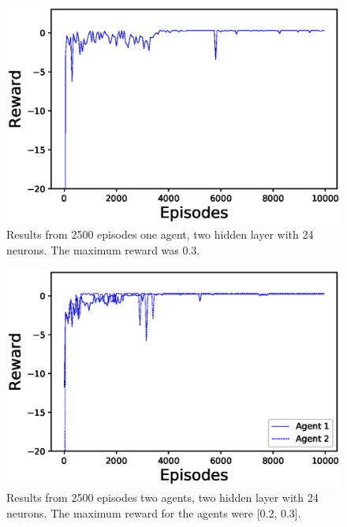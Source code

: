 \documentclass[journal,twoside]{IEEEtran}
\begin{document}
\begin{figure}[!h]
	\centering
	\includegraphics[width=\columnwidth]{1Agent_32n__2l_215000steps_125s}
	\caption{Results from 2500 episodes one agent, two hidden layer with 24 neurons. The maximum reward was 0.3.}
	\label{1agent32n}
\end{figure}

\begin{figure}[!h]
	\centering
	\includegraphics[width=\columnwidth]{2Agent_24n_2l_380000steps_251s}
	\caption{Results from 2500 episodes two agents, two hidden layer with 24 neurons. The maximum reward for the agents were [0.2, 0.3].}
	\label{2agent24n}    
\end{figure}
\end{document}
